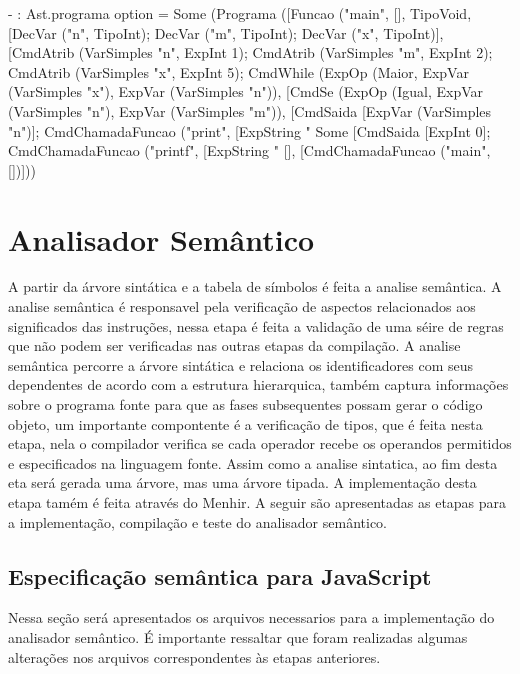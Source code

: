 \documentclass[12pt,a4paper,twoside]{article}
\begin{document}
\begin{terminal}
- : Ast.programa option =
Some
 (Programa
   ([Funcao ("main", [], TipoVoid,
      [DecVar ("n", TipoInt); DecVar ("m", TipoInt); DecVar ("x", TipoInt)],
      [CmdAtrib (VarSimples "n", ExpInt 1);
       CmdAtrib (VarSimples "m", ExpInt 2);
       CmdAtrib (VarSimples "x", ExpInt 5);
       CmdWhile
        (ExpOp (Maior, ExpVar (VarSimples "x"), ExpVar (VarSimples "n")),
        [CmdSe
          (ExpOp (Igual, ExpVar (VarSimples "n"), ExpVar (VarSimples "m")),
          [CmdSaida [ExpVar (VarSimples "n")];
           CmdChamadaFuncao ("print",
            [ExpString "%
          Some
           [CmdSaida [ExpInt 0];
            CmdChamadaFuncao ("printf",
             [ExpString "%
   [], [CmdChamadaFuncao ("main", [])]))
\end{terminal}

\section{Analisador Semântico}
A partir da árvore sintática e a tabela de símbolos é feita a analise semântica. A analise semântica é responsavel pela verificação de aspectos relacionados aos significados das instruções, nessa etapa é feita a validação de uma séire de regras que não podem ser verificadas nas outras etapas da compilação. \newline
A analise semântica percorre a árvore sintática e relaciona os identificadores com seus dependentes de acordo com a estrutura hierarquica, também captura informações sobre o programa fonte para que as fases subsequentes possam gerar o código objeto, um importante compontente é a verificação de tipos, que é feita nesta etapa, nela o compilador verifica se cada operador recebe os operandos permitidos e especificados na linguagem fonte. \newline
Assim como a analise sintatica, ao fim desta eta será gerada uma árvore, mas uma árvore tipada. A implementação desta etapa tamém é feita através do Menhir. A seguir são apresentadas as etapas para a implementação, compilação e teste do analisador semântico.

\subsection{Especificação semântica para JavaScript}
Nessa seção será apresentados os arquivos necessarios para a implementação do analisador semântico. É importante ressaltar que foram realizadas algumas alterações nos arquivos correspondentes às etapas anteriores.
\end{document}
